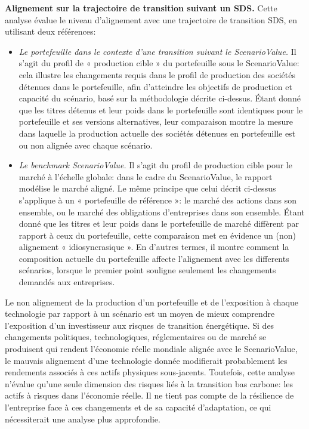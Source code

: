 \documentclass[10pt,table,a4]{article}\usepackage[]{graphicx}\usepackage[]{color}
\begin{document}
	\begin{multicols}{2}
		
		
		{\small\textbf{Alignement sur la trajectoire de transition suivant un SDS.} Cette analyse évalue le niveau d'alignement avec une trajectoire de transition SDS, en utilisant deux références:
		
		\begin{itemize}
			\item{\textit{Le portefeuille dans le contexte d'une transition suivant le  ScenarioValue.} Il s'agit du profil de « production cible » du portefeuille sous le ScenarioValue: cela illustre les changements requis dans le profil de production des sociétés détenues dans le portefeuille, afin d'atteindre les objectifs de production et capacité du scénario, basé sur la méthodologie décrite ci-dessus. Étant donné que les titres détenus et leur poids dans le portefeuille sont identiques pour le portefeuille et ses versions alternatives, leur comparaison montre la mesure dans laquelle la production actuelle des sociétés détenues en portefeuille est ou non alignée avec chaque scénario. }
			
			\item{\textit{Le benchmark  ScenarioValue. }Il s'agit du profil de production cible pour le marché à l'échelle globale: dans le cadre du ScenarioValue, le rapport modélise le marché aligné. Le même principe que celui décrit ci-dessus s'applique à un « portefeuille de référence »: le marché des actions dans son ensemble, ou le marché des obligations d'entreprises dans son ensemble. Étant donné que les titres et leur poids dans le portefeuille de marché diffèrent par rapport à ceux du portefeuille, cette comparaison met en évidence un (non) alignement « idiosyncrasique ». En d'autres termes, il montre comment la composition actuelle du portefeuille affecte l'alignement avec les differents scénarios, lorsque le premier point souligne seulement les changements demandés aux entreprises.}
		\end{itemize}
		
		
		Le non alignement de la production d'un portefeuille et de l'exposition à chaque technologie par rapport à un scénario est un moyen de mieux comprendre l'exposition d'un investisseur aux risques de transition énergétique. Si des changements politiques, technologiques, réglementaires ou de marché  se produisent qui rendent l'économie réelle mondiale alignée avec le ScenarioValue, le mauvais alignement d'une technologie donnée modifierait probablement les rendements associés à ces actifs physiques sous-jacents. Toutefois, cette analyse n'évalue qu'une seule dimension des risques liés à la transition bas carbone: les actifs à risques dans l'économie réelle. Il ne tient pas compte de la résilience de l'entreprise face à ces changements et de sa capacité d'adaptation, ce qui nécessiterait une analyse plus approfondie. 
		
}
\end{multicols}
\end{document}

